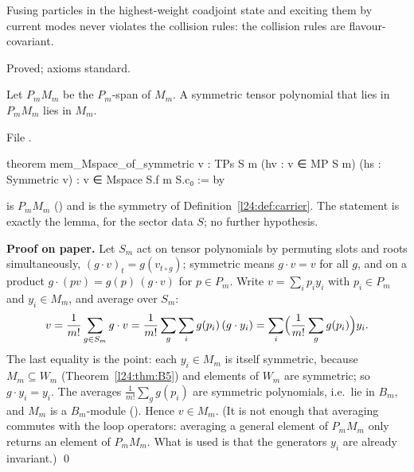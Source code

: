 \begin{physics}
Fusing particles in the highest-weight coadjoint state and exciting them by current modes never violates the collision rules: the
collision rules are flavour-covariant.
\end{physics}

\begin{status}
Proved; axioms standard.
\end{status}

\begin{lemma}[Symmetrization]\label{l24:lem:reynolds}
Let $P_mM_m$ be the $P_m$-span of $M_m$. A symmetric tensor polynomial that lies in $P_mM_m$ lies in $M_m$.
\end{lemma}
\noindent File .
\begin{leancode}
theorem mem_Mspace_of_symmetric {v : TPs S m} (hv : v ∈ MP S m) (hs : Symmetric v) :
    v ∈ Mspace S.f m S.c₀ := by
\end{leancode}

\begin{dictionary}
 is $P_mM_m$ () and  is the symmetry of
Definition~\ref{l24:def:carrier}. The statement is exactly the lemma, for the sector data $S$; no further hypothesis.
\end{dictionary}

\textbf{Proof on paper.} Let $S_m$ act on tensor polynomials by permuting slots and roots simultaneously,
$(g\cdot v)_t=g(v_{t\circ g})$; symmetric means $g\cdot v=v$ for all $g$, and on a product $g\cdot(pv)=g(p)\,(g\cdot v)$ for
$p\in P_m$. Write $v=\sum_ip_iy_i$ with $p_i\in P_m$ and $y_i\in M_m$, and average over $S_m$:
\begin{equation*}
v=\frac1{m!}\sum_{g\in S_m}g\cdot v=\frac1{m!}\sum_{g}\sum_ig(p_i)\,(g\cdot y_i)=\sum_i\Bigl(\frac1{m!}\sum_gg(p_i)\Bigr)y_i .
\end{equation*}
The last equality is the point: each $y_i\in M_m$ is itself symmetric, because $M_m\subseteq W_m$ (Theorem~\ref{l24:thm:B5})
and elements of $W_m$ are symmetric; so $g\cdot y_i=y_i$. The averages $\frac1{m!}\sum_gg(p_i)$ are symmetric polynomials, i.e.\
lie in $B_m$, and $M_m$ is a $B_m$-module (). Hence $v\in M_m$. (It is not enough that averaging
commutes with the loop operators: averaging a general element of $P_mM_m$ only returns an element of $P_mM_m$. What is used is
that the generators $y_i$ are already invariant.) \qed

